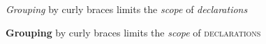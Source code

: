 \documentclass{article}
\newcommand{\keyworda}[1]{\textit{#1}}
\newcommand{\keywordb}[2][\bfseries]{{#1#2}}
\begin{document}
	\keyworda{Grouping} by curly braces limits the \keyworda{scope} of \keyworda{declarations}
	
	\keywordb{Grouping} by curly braces limits the \keywordb[\itshape]{scope} of \keywordb[\scshape]{declarations}
\end{document}

